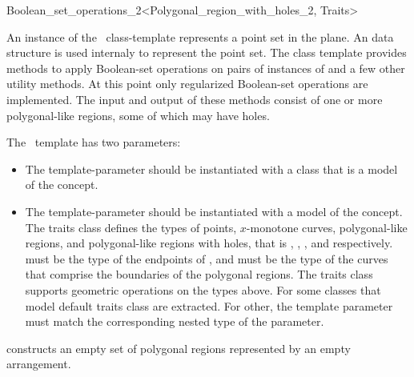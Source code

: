 \ccRefPageBegin

\begin{ccRefClass}{Boolean_set_operations_2<Polygonal_region_with_holes_2, Traits>}
    
\ccDefinition
An instance of the \ccClassTemplateName\ class-template represents a
point set in the plane. An  data structure is used
internaly to represent the point set. The class template provides
methods to apply Boolean-set operations on pairs of instances of  
 and a few other utility methods. At this
point only regularized Boolean-set operations are implemented.
The input and output of these methods consist of one or more
polygonal-like regions, some of which may have holes.

The \ccClassTemplateName\ template has two parameters:
\begin{itemize}
\item The  template-parameter should
be instantiated with a class that is a model of the
 concept.
\item The  template-parameter should be instantiated with
a model of the  concept. The traits
class defines the types of points, $x$-monotone curves, polygonal-like
regions, and polygonal-like regions with holes, that is ,
, , and
 respectively.  must
be the type of the endpoints of , and
 must be the type of the curves that comprise
the boundaries of the polygonal regions. The traits class supports
geometric operations on the types above. For some classes that model
 default traits class are
extracted. For other, the template parameter
 must match the corresponding
nested type of the  parameter.
\end{itemize}

\ccTypes
\ccGlue
{} 


\ccCreation
{}
    
  {constructs an empty set of polygonal regions represented by an
  empty arrangement.}
    

\end{ccRefClass}
